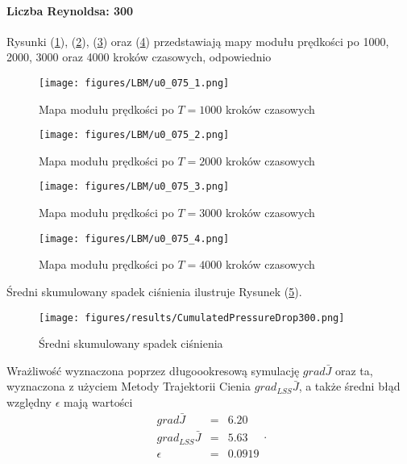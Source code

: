 \documentclass[12pt, twoside]{book}
\begin{document}
\paragraph{Liczba Reynoldsa: 300}
Rysunki (\ref{Fig36}), (\ref{Fig37}), (\ref{Fig38}) oraz (\ref{Fig39}) przedstawiają mapy modułu prędkości po 1000, 2000, 3000 oraz 4000 kroków czasowych, odpowiednio 
\begin{figure}[H]
	\texttt{[image: figures/LBM/u0\_075\_1.png]} 
	\caption{Mapa modułu prędkości po $ T=1000 $ kroków czasowych}
	\label{Fig36}
\end{figure}
\begin{figure}[H]
	\texttt{[image: figures/LBM/u0\_075\_2.png]} 
	\caption{Mapa modułu prędkości po $ T=2000 $ kroków czasowych}
	\label{Fig37}
\end{figure}
\begin{figure}[H]
	\texttt{[image: figures/LBM/u0\_075\_3.png]} 
	\caption{Mapa modułu prędkości po $ T=3000 $ kroków czasowych}
	\label{Fig38}
\end{figure}
\begin{figure}[H]
	\texttt{[image: figures/LBM/u0\_075\_4.png]} 
	\caption{Mapa modułu prędkości po $ T=4000 $ kroków czasowych}
	\label{Fig39}
\end{figure}
Średni skumulowany spadek ciśnienia ilustruje Rysunek (\ref{Fig40}).
\begin{figure}[H]
	\texttt{[image: figures/results/CumulatedPressureDrop300.png]} 
	\centering
	\caption{Średni skumulowany spadek ciśnienia}
	\label{Fig40}
\end{figure}
Wrażliwość wyznaczona poprzez długoookresową symulację $ grad\bar{J} $ oraz ta, wyznaczona z użyciem Metody Trajektorii Cienia $ grad_{LSS}\bar{J} $, a także średni błąd względny $ \epsilon $ mają wartości
\begin{equation}
\begin{array}{rcl}
grad\bar{J} &=& 6.20\\
grad_{LSS}\bar{J} &=& 5.63 \\
\epsilon &=& 0.0919
\end{array} .
\label{results300}
\end{equation}
\end{document}
